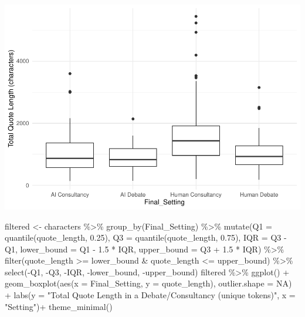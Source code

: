 \documentclass[
]{article}
\newenvironment{Shaded}{\begin{snugshade}}{\end{snugshade}}
\newcommand{\AttributeTok}[1]{\textcolor[rgb]{0.77,0.63,0.00}{#1}}
\newcommand{\ConstantTok}[1]{\textcolor[rgb]{0.00,0.00,0.00}{#1}}
\newcommand{\FloatTok}[1]{\textcolor[rgb]{0.00,0.00,0.81}{#1}}
\newcommand{\FunctionTok}[1]{\textcolor[rgb]{0.00,0.00,0.00}{#1}}
\newcommand{\NormalTok}[1]{#1}
\newcommand{\OtherTok}[1]{\textcolor[rgb]{0.56,0.35,0.01}{#1}}
\newcommand{\SpecialCharTok}[1]{\textcolor[rgb]{0.00,0.00,0.00}{#1}}
\newcommand{\StringTok}[1]{\textcolor[rgb]{0.31,0.60,0.02}{#1}}
\begin{document}
\includegraphics[width=1\linewidth]{debate-2309_files/figure-latex/quote_length graph-2}

\begin{Shaded}
\begin{Highlighting}[]
\NormalTok{filtered }\OtherTok{\textless{}{-}}\NormalTok{ characters }\SpecialCharTok{\%\textgreater{}\%}
  \FunctionTok{group\_by}\NormalTok{(Final\_Setting) }\SpecialCharTok{\%\textgreater{}\%}
  \FunctionTok{mutate}\NormalTok{(}\AttributeTok{Q1 =} \FunctionTok{quantile}\NormalTok{(quote\_length, }\FloatTok{0.25}\NormalTok{),}
         \AttributeTok{Q3 =} \FunctionTok{quantile}\NormalTok{(quote\_length, }\FloatTok{0.75}\NormalTok{),}
         \AttributeTok{IQR =}\NormalTok{ Q3 }\SpecialCharTok{{-}}\NormalTok{ Q1,}
         \AttributeTok{lower\_bound =}\NormalTok{ Q1 }\SpecialCharTok{{-}} \FloatTok{1.5} \SpecialCharTok{*}\NormalTok{ IQR,}
         \AttributeTok{upper\_bound =}\NormalTok{ Q3 }\SpecialCharTok{+} \FloatTok{1.5} \SpecialCharTok{*}\NormalTok{ IQR) }\SpecialCharTok{\%\textgreater{}\%}
  \FunctionTok{filter}\NormalTok{(quote\_length }\SpecialCharTok{\textgreater{}=}\NormalTok{ lower\_bound }\SpecialCharTok{\&}\NormalTok{ quote\_length }\SpecialCharTok{\textless{}=}\NormalTok{ upper\_bound) }\SpecialCharTok{\%\textgreater{}\%}
  \FunctionTok{select}\NormalTok{(}\SpecialCharTok{{-}}\NormalTok{Q1, }\SpecialCharTok{{-}}\NormalTok{Q3, }\SpecialCharTok{{-}}\NormalTok{IQR, }\SpecialCharTok{{-}}\NormalTok{lower\_bound, }\SpecialCharTok{{-}}\NormalTok{upper\_bound)}
\NormalTok{filtered }\SpecialCharTok{\%\textgreater{}\%}
  \FunctionTok{ggplot}\NormalTok{() }\SpecialCharTok{+}
  \FunctionTok{geom\_boxplot}\NormalTok{(}\FunctionTok{aes}\NormalTok{(}\AttributeTok{x =}\NormalTok{ Final\_Setting, }\AttributeTok{y =}\NormalTok{ quote\_length), }\AttributeTok{outlier.shape =} \ConstantTok{NA}\NormalTok{) }\SpecialCharTok{+}
  \FunctionTok{labs}\NormalTok{(}\AttributeTok{y =} \StringTok{"Total Quote Length in a Debate/Consultancy (unique tokens)"}\NormalTok{, }\AttributeTok{x =} \StringTok{"Setting"}\NormalTok{)}\SpecialCharTok{+}
  \FunctionTok{theme\_minimal}\NormalTok{()}
\end{Highlighting}
\end{Shaded}
\end{document}
